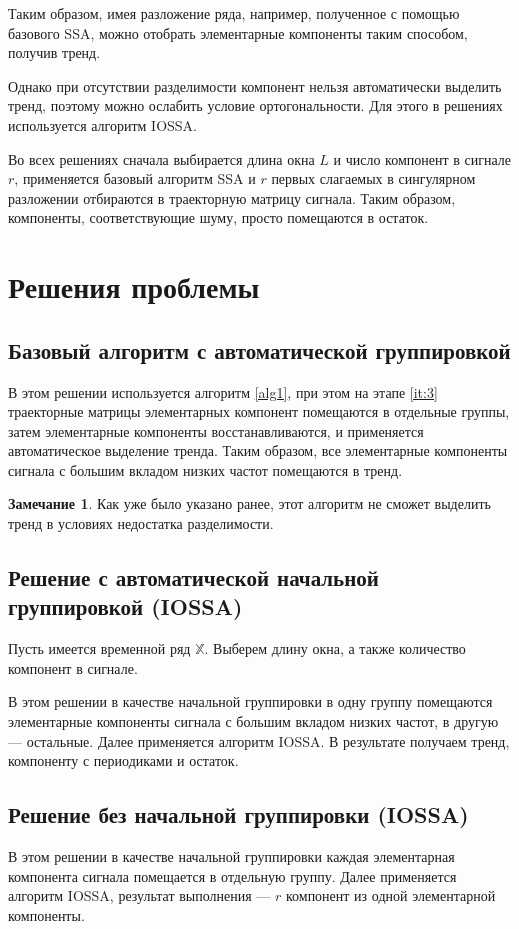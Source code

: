 \documentclass[specialist, substylefile = spbureport.rtx, subf,href,colorlinks=true, 12pt]{disser}
\theoremstyle{definition}
\newtheorem{remark}{Замечание}
\begin{document}
Таким образом, имея разложение ряда, например, полученное с помощью базового SSA, можно отобрать элементарные компоненты таким способом, получив тренд.

Однако при отсутствии разделимости компонент нельзя автоматически выделить тренд, поэтому можно ослабить условие ортогональности. Для этого в решениях используется алгоритм IOSSA.

Во всех решениях сначала выбирается длина окна $L$ и число компонент в сигнале $r$, применяется базовый алгоритм SSA и $r$ первых слагаемых в сингулярном разложении отбираются в траекторную матрицу сигнала. Таким образом, компоненты, соответствующие шуму, просто помещаются в остаток.
\section{Решения проблемы}
\subsection{Базовый алгоритм с автоматической группировкой}
В этом решении используется алгоритм \ref{alg1}, при этом на этапе \ref{it:3} траекторные матрицы элементарных компонент помещаются в отдельные группы, затем элементарные компоненты восстанавливаются, и применяется автоматическое выделение тренда. Таким образом, все элементарные компоненты сигнала с большим вкладом низких частот помещаются в тренд.

\begin{remark}
 Как уже было указано ранее, этот алгоритм не сможет выделить тренд в условиях недостатка разделимости.
\end{remark}

\subsection{Решение с автоматической начальной группировкой (IOSSA)}
Пусть имеется временной ряд $\mathbb{X}$. Выберем длину окна, а также количество компонент в сигнале.

В этом решении в качестве начальной группировки в одну группу помещаются элементарные компоненты сигнала с большим вкладом низких частот, в другую — остальные. Далее применяется алгоритм IOSSA. В результате получаем тренд, компоненту с периодиками и остаток.

\subsection{Решение без начальной группировки (IOSSA)}
В этом решении в качестве начальной группировки каждая элементарная компонента сигнала помещается в отдельную группу. Далее применяется алгоритм IOSSA, результат выполнения --- $r$ компонент из одной элементарной компоненты.
\end{document}
